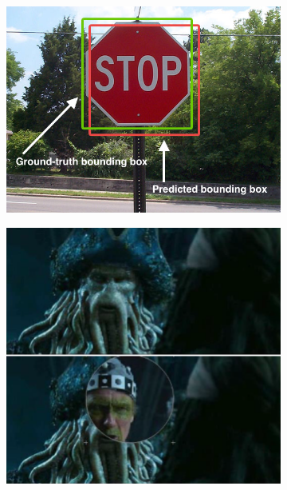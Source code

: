 \begin{figure}
  \centering  
  \begin{subfigure}[t]{0.48\textwidth}
    \centering
    \includegraphics[width=\textwidth]{img/9.jpg}
  \end{subfigure}
  \vspace{7mm}
  \hfill
  \begin{subfigure}[t]{0.48\textwidth}
    \centering
    \includegraphics[width=\textwidth]{img/2.png}
  \end{subfigure}

\end{figure}
